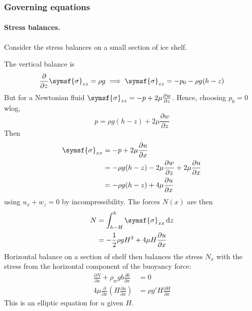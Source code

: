 \documentclass{jknotes}
\begin{document}
\subsubsection{Governing equations}
\paragraph{Stress balances.} Consider the stress balances on a small section
of ice shelf.
\begin{center}
\end{center}

The vertical balance is
\begin{equation}
	\frac{\partial}{\partial z} \symsf{\sigma}_{zz} = \rho g\implies
	\symsf{\sigma}_{zz} = -p_0 - \rho g(h-z)
\end{equation}
But for a Newtonian fluid $\symsf{\sigma}_{zz} = -p + 2\mu \frac{\partial
w}{\partial z}$. Hence, choosing $p_0 = 0$ wlog,
\begin{equation}
	p = \rho g (h-z) + 2\mu \frac{\partial w}{\partial z}
\end{equation}
Then 
\begin{align}
	\symsf{\sigma}_{xx} &= -p + 2\mu \frac{\partial u}{\partial x} \\
				&= -\rho g (h-z) - 2\mu \frac{\partial w}{\partial z} + 2\mu
				\frac{\partial u}{\partial x} \\
				&= -\rho g(h-z) + 4\mu \frac{\partial u}{\partial x}
\end{align}
using $u_x + w_z = 0$ by incompressibility. The forces $N(x)$ are then
\begin{align}
	N &= \int_{h-H}^h \symsf{\sigma}_{xx} \, \diffd z \\
	  &= -\frac{1}{2}\rho g H^2 + 4\mu H \frac{\partial u}{\partial
	  x}\label{eq:l15:idk}
\end{align}
Horizontal balance on a section of shelf then balances the stress $N_x$
with the stress from the horizontal component of the buoyancy force:
\begin{align}
	\frac{\partial N}{\partial x} + \rho_w g b \frac{\partial b}{\partial x} &= 0 \\
	4\mu \frac{\partial}{\partial x} \left( H \frac{\partial u}{\partial x}
	\right) &= \rho g' H \frac{\partial H}{\partial x} \label{eq:l15:1}
\end{align}
This is an elliptic equation for $u$ given $H$.
\end{document}
